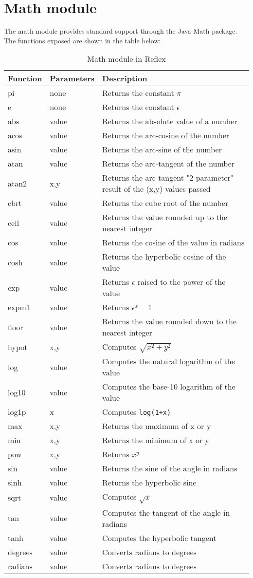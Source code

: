 \section{Math module}
The math module provides standard support through the Java Math package. The functions exposed are shown in the table below:
\begin{table}[!h]
  \small
\centering
\begin{tabular} { | l | l | p{9cm}  | }
\hline
Function  & Parameters & Description   \\
\hline
pi & none & Returns the constant $\pi$   \\
e & none & Returns the constant $\epsilon$   \\
abs & value & Returns the absolute value of a number  \\
acos & value & Returns the arc-cosine of the number \\
asin & value & Returns the arc-sine of the number \\
atan & value & Returns the arc-tangent of the number \\
atan2 & x,y & Returns the arc-tangent "2 parameter" result of the (x,y) values passed \\
cbrt & value & Returns the cube root of the number \\
ceil & value & Returns the value rounded up to the nearest integer \\
cos & value & Returns the cosine of the value in radians \\
cosh & value & Returns the hyperbolic cosine of the value \\
exp & value & Returns $\epsilon$ raised to the power of the value \\
expm1 & value & Returns $\epsilon^x - 1 $ \\
floor & value & Returns the value rounded down to the nearest integer \\
hypot & x,y & Computes $ \sqrt { x^2 + y^2 } $ \\
log & value & Computes the natural logarithm of the value \\
log10 & value & Computes the base-10 logarithm of the value \\
log1p & x & Computes \Verb^log(1+x)^ \\
max & x,y & Returns the maximum of x or y \\
min & x,y & Returns the minimum of x or y \\
pow & x,y & Returns $x^y$ \\
sin & value & Returns the sine of the angle in radians \\
sinh & value & Returns the hyperbolic sine \\
sqrt & value & Computes $\sqrt x $ \\
tan & value & Computes the tangent of the angle in radians \\
tanh & value & Computes the hyperbolic tangent \\
degrees & value & Converts radians to degrees \\
radians & value & Converts radians to degrees \\
\hline
\end{tabular}
\caption{Math module in Reflex}
\end{table}
